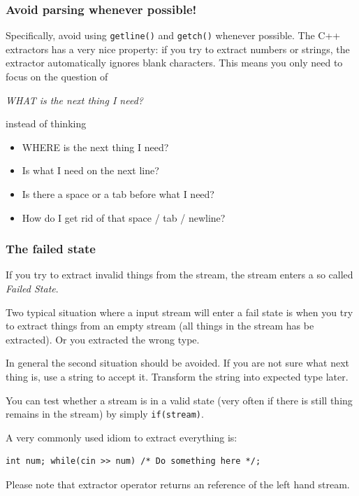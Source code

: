 \begin{frame}[fragile]
\frametitle{Avoid parsing whenever possible!}
Specifically, avoid using \texttt{getline()} and \texttt{getch()} whenever possible. The C++ extractors has a very nice property: if you try to extract numbers or strings, the extractor automatically ignores blank characters. This means you only need to focus on the question of 
\begin{center}
\textit{WHAT is the next thing I need?}
\end{center}

instead of thinking 
\begin{itemize}
\item WHERE is the next thing I need?
\item Is what I need on the next line?
\item Is there a space or a tab before what I need?
\item How do I get rid of that space / tab / newline?
\end{itemize}
\end{frame}

\begin{frame}[fragile]
\frametitle{The failed state}
If you try to extract invalid things from the stream, the stream enters a so called \textit{Failed State}. 

Two typical situation where a input stream will enter a fail state is when you try to extract things from an empty stream (all things in the stream has be extracted). Or you extracted the wrong type.

In general the second situation should be avoided. If you are not sure what next thing is, use a string to accept it. Transform the string into expected type later.

You can test whether a stream is in a valid state (very often if there is still thing remains in the stream) by simply \texttt{if(stream)}.

A very commonly used idiom to extract everything is:

\begin{verbatim}
int num; while(cin >> num) /* Do something here */;
\end{verbatim}

Please note that extractor operator returns an reference of the left hand stream.
\end{frame}

